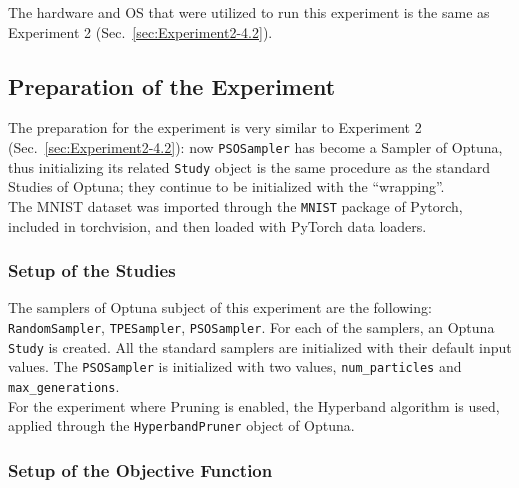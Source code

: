 The hardware and OS that were utilized to run this experiment is the same as Experiment 2 (Sec.~\ref{sec:Experiment2-4.2}).

\subsection{Preparation of the Experiment}

The preparation for the experiment is very similar to Experiment 2 (Sec.~\ref{sec:Experiment2-4.2}): now \texttt{PSOSampler} has become a Sampler of Optuna, thus initializing its related \texttt{Study} object is the same procedure as the standard Studies of Optuna; they continue to be initialized with the “wrapping”.
\\[0.3cm]The MNIST dataset was imported through the \texttt{MNIST} package of Pytorch, included in torchvision, and then loaded with PyTorch data loaders.

\subsubsection{Setup of the Studies}

The samplers of Optuna subject of this experiment are the following: \texttt{RandomSampler}, \texttt{TPESampler}, \texttt{PSOSampler}.
For each of the samplers, an Optuna \texttt{Study} is created. All the standard samplers are initialized with their default input values. The \texttt{PSOSampler} is initialized with two values, \texttt{num\_particles} and \texttt{max\_generations}.
\\[0.3cm]For the experiment where Pruning is enabled, the Hyperband algorithm is used, applied through the \texttt{HyperbandPruner} object of Optuna.

\subsubsection{Setup of the Objective Function}

